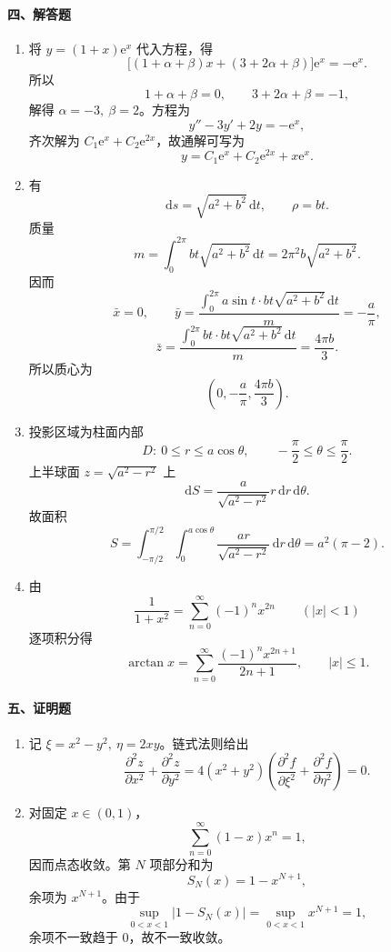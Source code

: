 \paragraph*{四、解答题}
\begin{enumerate}
  \item 将 \(y=(1+x)\mathrm{e}^x\) 代入方程，得
  \[
    \bigl[(1+\alpha+\beta)x+(3+2\alpha+\beta)\bigr]\mathrm{e}^x=-\mathrm{e}^x.
  \]
  所以
  \[
    1+\alpha+\beta=0,\qquad 3+2\alpha+\beta=-1,
  \]
  解得 \(\alpha=-3,\ \beta=2\)。方程为
  \[
    y''-3y'+2y=-\mathrm{e}^x,
  \]
  齐次解为 \(C_1\mathrm{e}^x+C_2\mathrm{e}^{2x}\)，故通解可写为
  \[
    y=C_1\mathrm{e}^x+C_2\mathrm{e}^{2x}+x\mathrm{e}^x.
  \]

  \item 有
  \[
    \mathrm{d}s=\sqrt{a^2+b^2}\,\mathrm{d}t,\qquad \rho=bt.
  \]
  质量
  \[
    m=\int_0^{2\pi}bt\sqrt{a^2+b^2}\,\mathrm{d}t
    =2\pi^2b\sqrt{a^2+b^2}.
  \]
  因而
  \[
    \bar x=0,\qquad
    \bar y=\frac{\int_0^{2\pi}a\sin t\cdot bt\sqrt{a^2+b^2}\,\mathrm{d}t}{m}
    =-\frac a\pi,
  \]
  \[
    \bar z=\frac{\int_0^{2\pi}bt\cdot bt\sqrt{a^2+b^2}\,\mathrm{d}t}{m}
    =\frac{4\pi b}{3}.
  \]
  所以质心为
  \[
    \left(0,-\frac a\pi,\frac{4\pi b}{3}\right).
  \]

  \item 投影区域为柱面内部
  \[
    D:\ 0\le r\le a\cos\theta,\qquad -\frac{\pi}{2}\le\theta\le\frac{\pi}{2}.
  \]
  上半球面 \(z=\sqrt{a^2-r^2}\) 上
  \[
    \mathrm{d}S=\frac{a}{\sqrt{a^2-r^2}}r\,\mathrm{d}r\,\mathrm{d}\theta.
  \]
  故面积
  \[
    S=\int_{-\pi/2}^{\pi/2}\int_0^{a\cos\theta}
    \frac{ar}{\sqrt{a^2-r^2}}\,\mathrm{d}r\,\mathrm{d}\theta
    =a^2(\pi-2).
  \]

  \item 由
  \[
    \frac1{1+x^2}=\sum_{n=0}^{\infty}(-1)^n x^{2n}\qquad (|x|<1)
  \]
  逐项积分得
  \[
    \arctan x=\sum_{n=0}^{\infty}\frac{(-1)^n x^{2n+1}}{2n+1},
    \qquad |x|\le 1.
  \]
\end{enumerate}

\paragraph*{五、证明题}
\begin{enumerate}
  \item 记 \(\xi=x^2-y^2,\ \eta=2xy\)。链式法则给出
  \[
    \frac{\partial^2z}{\partial x^2}+\frac{\partial^2z}{\partial y^2}
    =4(x^2+y^2)\left(\frac{\partial^2f}{\partial \xi^2}+\frac{\partial^2f}{\partial \eta^2}\right)=0.
  \]

  \item 对固定 \(x\in(0,1)\)，
  \[
    \sum_{n=0}^{\infty}(1-x)x^n=1,
  \]
  因而点态收敛。第 \(N\) 项部分和为
  \[
    S_N(x)=1-x^{N+1},
  \]
  余项为 \(x^{N+1}\)。由于
  \[
    \sup_{0<x<1}|1-S_N(x)|=\sup_{0<x<1}x^{N+1}=1,
  \]
  余项不一致趋于 \(0\)，故不一致收敛。
\end{enumerate}

